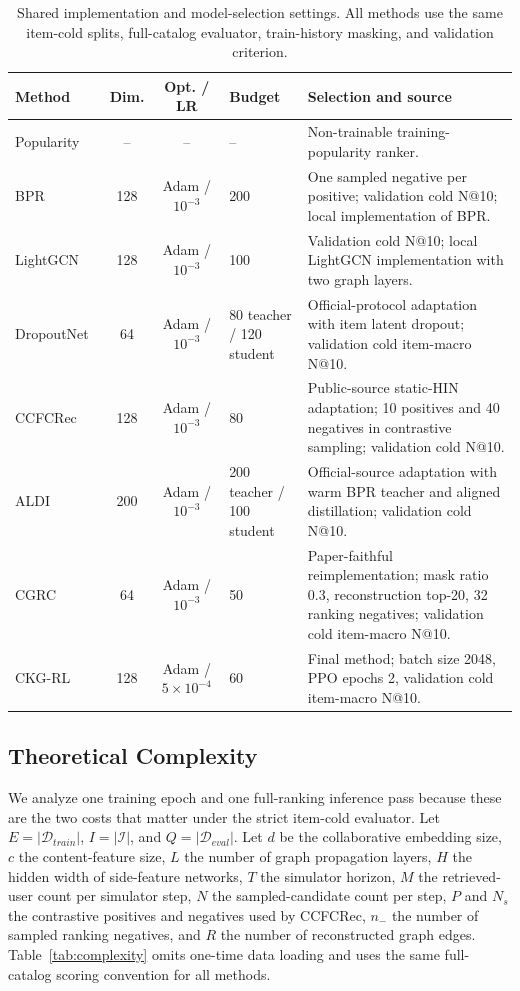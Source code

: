 \documentclass[sigconf,anonymous,review]{acmart}
\begin{document}
\begin{table}[t]
\centering
\caption{Shared implementation and model-selection settings. All methods use the same item-cold splits, full-catalog evaluator, train-history masking, and validation criterion.}
\label{tab:implementation-details}
\footnotesize
\setlength{\tabcolsep}{3.5pt}
\renewcommand{\arraystretch}{1.10}
\begin{tabular}{lccp{2.5cm}p{6.8cm}}
\toprule
Method & Dim. & Opt. / LR & Budget & Selection and source \\
\midrule
Popularity & -- & -- & -- & Non-trainable training-popularity ranker. \\
BPR~\cite{rendle2009bpr} & 128 & Adam / \(10^{-3}\) & 200 & One sampled negative per positive; validation cold N@10; local implementation of BPR. \\
LightGCN~\cite{he2020lightgcn} & 128 & Adam / \(10^{-3}\) & 100 & Validation cold N@10; local LightGCN implementation with two graph layers. \\
DropoutNet~\cite{volkovs2017dropoutnet} & 64 & Adam / \(10^{-3}\) & 80 teacher / 120 student & Official-protocol adaptation with item latent dropout; validation cold item-macro N@10. \\
CCFCRec~\cite{zhou2023ccfcrec} & 128 & Adam / \(10^{-3}\) & 80 & Public-source static-HIN adaptation; 10 positives and 40 negatives in contrastive sampling; validation cold N@10. \\
ALDI~\cite{huang2023aldi} & 200 & Adam / \(10^{-3}\) & 200 teacher / 100 student & Official-source adaptation with warm BPR teacher and aligned distillation; validation cold N@10. \\
CGRC~\cite{kim2024cgrc} & 64 & Adam / \(10^{-3}\) & 50 & Paper-faithful reimplementation; mask ratio 0.3, reconstruction top-20, 32 ranking negatives; validation cold item-macro N@10. \\
CKG-RL & 128 & Adam / \(5{\times}10^{-4}\) & 60 & Final method; batch size 2048, PPO epochs 2, validation cold item-macro N@10. \\
\bottomrule
\end{tabular}
\end{table}

\subsection{Theoretical Complexity}
We analyze one training epoch and one full-ranking inference pass because these are the two costs that matter under the strict item-cold evaluator. Let \(E=|\mathcal{D}_{train}|\), \(I=|\mathcal{I}|\), and \(Q=|\mathcal{D}_{eval}|\). Let \(d\) be the collaborative embedding size, \(c\) the content-feature size, \(L\) the number of graph propagation layers, \(H\) the hidden width of side-feature networks, \(T\) the simulator horizon, \(M\) the retrieved-user count per simulator step, \(N\) the sampled-candidate count per step, \(P\) and \(N_s\) the contrastive positives and negatives used by CCFCRec, \(n_{-}\) the number of sampled ranking negatives, and \(R\) the number of reconstructed graph edges. Table~\ref{tab:complexity} omits one-time data loading and uses the same full-catalog scoring convention for all methods.
\end{document}
